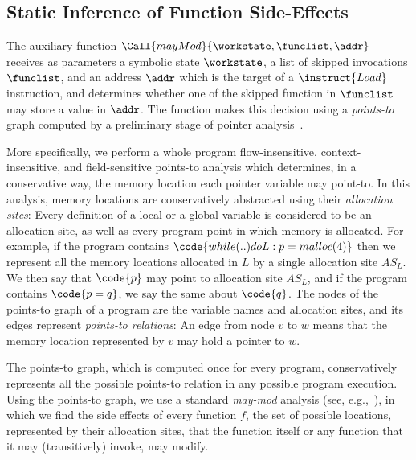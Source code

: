 
\subsection{Static Inference of Function Side-Effects}
\label{Se:MayMod}
\label{Se:IdentifyingLoads}

The auxiliary function $\Call{mayMod}{ \workstate, \funclist, \addr }$
receives as parameters a symbolic state $\workstate$, a list of
skipped invocations $\funclist$, and an address $\addr$ which is the
target of a $\instruct{Load}$ instruction, and determines whether one
of the skipped function in $\funclist$ may store a value in $\addr$.
The function makes this decision using a \emph{points-to} graph
computed by a preliminary stage of pointer
analysis~\cite{Hind:Paste2001, Smaragdakis:FTPL2015}.

More specifically, we perform a whole program flow-insensitive,
context-insensitive, and field-sensitive points-to analysis which
determines, in a conservative way, the memory location each pointer
variable may point-to. In this analysis, memory locations are
conservatively abstracted using their \emph{allocation sites}: Every
definition of a local or a global variable is considered to be an
allocation site, as well as every program point in which memory is
allocated. For example, if the program contains
$\code{while (..) do L: p=malloc(4)}$ then we represent all the memory
locations allocated in $L$ by a single allocation site
$\mathit{AS}_L$.  We then say that $\code{p}$ may point to allocation
site $\mathit{AS}_L$, and if the program contains $\code{p=q}$, we say
the same about $\code{q}$. The nodes of the points-to graph of a
program are the variable names and allocation sites, and its edges
represent \emph{points-to relations}: An edge from node $v$ to $w$
means that the memory location represented by $v$ may hold a pointer
to $w$.

The points-to graph, which is computed once for every program,
conservatively represents all the possible points-to relation in any
possible program execution. Using the points-to graph, we use a
standard \emph{may-mod} analysis (see, e.g.,~\cite{dragon-book}), in
which we find the side effects of every function $f$, \ie the set of
possible locations, represented by their allocation sites, that the
function itself or any function that it may (transitively) invoke, may
modify.

